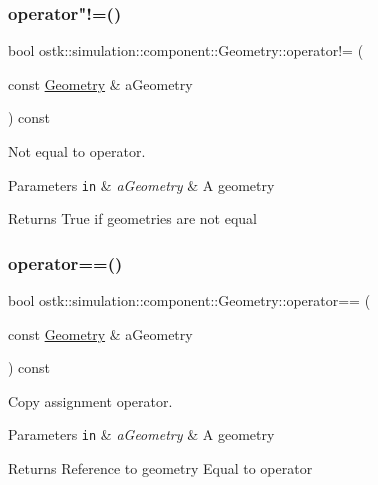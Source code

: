 \subsubsection{\texorpdfstring{operator"!=()}{operator!=()}}
{\footnotesize\ttfamily bool ostk\+::simulation\+::component\+::\+Geometry\+::operator!= (\begin{DoxyParamCaption}\item[{const \hyperlink{classostk_1_1simulation_1_1component_1_1_geometry}{Geometry} \&}]{a\+Geometry }\end{DoxyParamCaption}) const}



Not equal to operator. 


\begin{DoxyParams}[1]{Parameters}
\mbox{\tt in}  & {\em a\+Geometry} & A geometry \\
\hline
\end{DoxyParams}
\begin{DoxyReturn}{Returns}
True if geometries are not equal 
\end{DoxyReturn}
\mbox{\label{classostk_1_1simulation_1_1component_1_1_geometry_a1ec1b13d99e4c8df7f601f9f1ccb5458}} 
\subsubsection{\texorpdfstring{operator==()}{operator==()}}
{\footnotesize\ttfamily bool ostk\+::simulation\+::component\+::\+Geometry\+::operator== (\begin{DoxyParamCaption}\item[{const \hyperlink{classostk_1_1simulation_1_1component_1_1_geometry}{Geometry} \&}]{a\+Geometry }\end{DoxyParamCaption}) const}



Copy assignment operator. 


\begin{DoxyParams}[1]{Parameters}
\mbox{\tt in}  & {\em a\+Geometry} & A geometry \\
\hline
\end{DoxyParams}
\begin{DoxyReturn}{Returns}
Reference to geometry Equal to operator
\end{DoxyReturn}

